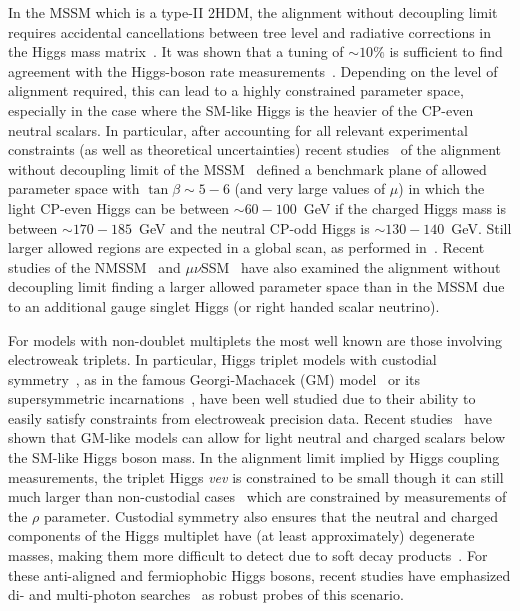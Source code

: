 \documentclass[../report.tex]{subfiles}
\begin{document}
In the MSSM which is a type-II 2HDM, the alignment without decoupling
limit~\cite{Carena:2013ooa} requires accidental cancellations between
tree level and radiative corrections in the Higgs mass
matrix~\cite{Bechtle:2016kui,Haber:2017erd}. It was shown that a tuning of $\sim 10\%$ is sufficient to find agreement with the Higgs-boson rate measurements~\cite{Bechtle:2016kui}. Depending on the level of alignment required, this can lead to a highly constrained parameter space, especially in the case where the SM-like Higgs is the heavier of the CP-even neutral scalars. In particular, after accounting for all relevant experimental constraints (as well as theoretical uncertainties) recent studies~\cite{Bahl:2018zmf} of the alignment without decoupling limit of the MSSM~\cite{Carena:2013ooa} defined a benchmark plane of allowed parameter space with $\tan\beta \sim 5 - 6$ (and very large values of $\mu$) in which the light CP-even Higgs can be between  $\sim 60 - 100$~GeV if the charged Higgs mass is between $\sim 170 - 185$~GeV and the neutral CP-odd Higgs is $\sim 130 - 140$~GeV. Still larger allowed regions are expected in a global scan, as performed in~\cite{Bechtle:2016kui}.
Recent studies of the NMSSM~\cite{Carena:2015moc,Domingo:2018uim} and
$\mu\nu$SSM~\cite{Biekotter:2017xmf} have also examined the alignment
without decoupling limit finding a larger allowed parameter space than in the
MSSM due to an additional gauge singlet Higgs (or right handed scalar
neutrino). 

For models with non-doublet multiplets the most well known are those involving electroweak triplets. In particular, Higgs triplet models with custodial symmetry~\cite{Sikivie:1980hm}, as in the famous Georgi-Machacek (GM) model~\cite{Georgi:1985nv,Chanowitz:1985ug,Gunion:1989ci,Gunion:1990dt,Hartling:2014zca} or its supersymmetric incarnations~\cite{Cort:2013foa,Garcia-Pepin:2014yfa,Vega:2017gkk}, have been well studied due to their ability to easily satisfy constraints from electroweak precision data. Recent studies~\cite{Davoudiasl:2004aj,Vega:2017gkk,Vega:2018ddp} have shown that GM-like models can allow for light neutral and charged scalars below the SM-like Higgs boson mass. In the alignment limit implied by Higgs coupling measurements, the triplet Higgs \emph{vev} is constrained to be small though it can still much larger than non-custodial cases~\cite{Tanabashi:2018oca,Haber:1999zh} which are constrained by measurements of the $\rho$ parameter. Custodial symmetry also ensures that the neutral and charged components of the Higgs multiplet have (at least approximately) degenerate masses, making them more difficult to detect due to soft decay products~\cite{Buckley:2009kv,Ismail:2016zby}. For these anti-aligned and fermiophobic Higgs bosons, recent studies have emphasized di- and multi-photon searches~\cite{Aaltonen:2016fnw,Delgado:2016arn,Brooijmans:2016vro,Vega:2018ddp} as robust probes of this scenario.
\end{document}
